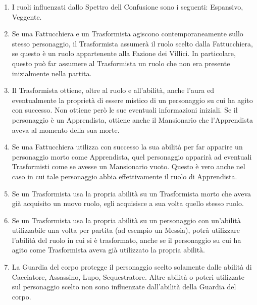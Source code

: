 \documentclass[a4paper,10pt]{article}
\begin{document}
\begin{enumerate}
\item I ruoli influenzati dallo Spettro dell Confusione sono i seguenti: Espansivo, Veggente.
	
	\item Se una Fattucchiera e un Trasformista agiscono contemporaneamente sullo stesso personaggio, il Trasformista assumerà il ruolo scelto dalla Fattucchiera, se questo è un ruolo appartenente alla Fazione dei Villici. In particolare, questo può far assumere al Trasformista un ruolo che non era presente inizialmente nella partita.
	
	\item Il Trasformista ottiene, oltre al ruolo e all'abilità, anche l'aura ed eventualmente la proprietà di essere mistico di un personaggio su cui ha agito con successo. Non ottiene però le sue eventuali informazioni iniziali. Se il personaggio è un Apprendista, ottiene anche il Mansionario che l'Apprendista aveva al momento della sua morte.
	
	\item Se una Fattucchiera utilizza con successo la sua abilità per far apparire un personaggio morto come Apprendista, quel personaggio apparirà ad eventuali Trasformisti come se avesse un Mansionario vuoto. Questo è vero anche nel caso in cui tale personaggio abbia effettivamente il ruolo di Apprendista.
	
	\item Se un Trasformista usa la propria abilità su un Trasformista morto che aveva già acquisito un nuovo ruolo, egli acquisisce a sua volta quello stesso ruolo. %
	
	\item Se un Trasformista usa la propria abilità su un personaggio con un'abilità utilizzabile una volta per partita (ad esempio un Messia), potrà utilizzare l'abilità del ruolo in cui si è trasformato, anche se il personaggio su cui ha agito come Trasformista aveva già utilizzato la propria abilità.
	
	\item La Guardia del corpo protegge il personaggio scelto solamente dalle abilità di Cacciatore, Assassino, Lupo, Sequestratore. Altre abilità o poteri utilizzate sul personaggio scelto non sono influenzate dall'abilità della Guardia del corpo.


\end{enumerate}
\end{document}
